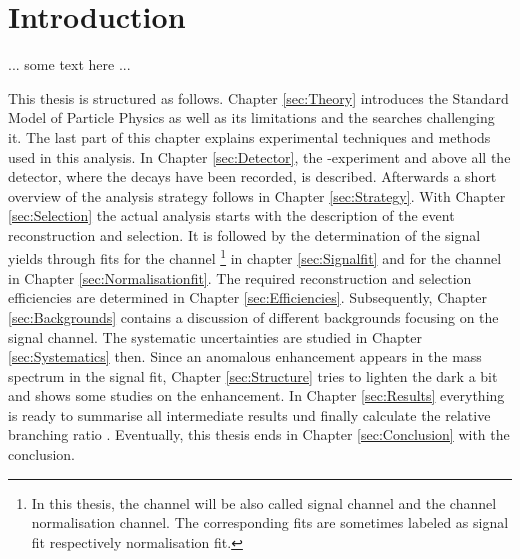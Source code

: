 \chapter{Introduction}
\label{sec:Introduction}

... some text here ...


This thesis is structured as follows.
Chapter \ref{sec:Theory} introduces the Standard Model of Particle Physics as well as its limitations and the searches challenging it. The last part of this chapter explains experimental techniques and methods used in this analysis.
In Chapter \ref{sec:Detector}, the \lhcb-experiment and above all the detector, where the decays have been recorded, is described.
Afterwards a short overview of the analysis strategy follows in Chapter \ref{sec:Strategy}.
With Chapter \ref{sec:Selection} the actual analysis starts with the description of the event reconstruction and selection.
It is followed by the determination of the signal yields through fits for the \LbToDpmunuX channel 
\footnote{In this thesis, the channel \LbToDpmunuX will be also called signal channel and the \LbToLcmunu channel normalisation channel. The corresponding fits are sometimes labeled as signal fit respectively normalisation fit.}
in chapter \ref{sec:Signalfit} and for the \LbToLcmunu channel in Chapter \ref{sec:Normalisationfit}.
The required reconstruction and selection efficiencies are determined in Chapter \ref{sec:Efficiencies}.
Subsequently, Chapter \ref{sec:Backgrounds} contains a discussion of different backgrounds focusing on the \LbToDpmunuX signal channel.
The systematic uncertainties are studied in Chapter \ref{sec:Systematics} then.
Since an anomalous enhancement appears in the \Dz\proton mass spectrum in the signal fit, Chapter \ref{sec:Structure} tries to lighten the dark a bit and shows some studies on the enhancement.
In Chapter \ref{sec:Results} everything is ready to summarise all intermediate results und finally calculate the relative branching ratio \R.
Eventually, this thesis ends in Chapter \ref{sec:Conclusion} with the conclusion.

